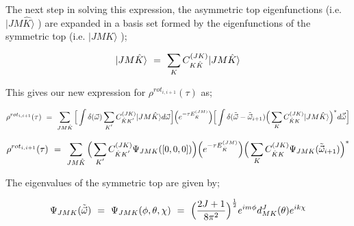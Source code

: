 \documentclass{ece}
\begin{document}
The next step in solving this expression, the asymmetric top eigenfunctions (i.e. \begin{math} | JM\hat{K} \rangle  \end{math} ) are expanded in a basis set formed by the eigenfunctions of the symmetric top (i.e. \begin{math} | JMK \rangle  \end{math} );

\begin{equation}
    | JM\hat{K} \rangle \hspace{0.125cm} = \hspace{0.125cm} \sum_{K} C_{K \hat{K}}^{(JK)} | JM\hat{K} \rangle  
\end{equation}

This gives our new expression for \begin{math}  \rho^{rot_{i, i+1}} ( \tau ) \end{math} as;

\begin{equation}
    \rho^{rot_{i, i+1}} ( \tau ) \hspace{0.125cm} = \hspace{0.125cm} \sum_{J M \hat{K}} \Big[ \int \delta ( \vec{\omega} ) \sum_{K^{'}} C_{\hat{K} K^{'}}^{(JK)} | JM\hat{K}  \rangle d \vec{\omega} \Big] \Big( e^{- \tau E_{\hat{K}}^{(JM)}} \Big) \Big[ \int \delta ( \Tilde{\vec{\omega}} - \Tilde{\vec{\omega}}_{i+1} ) \Big( \sum_{K} C_{\hat{K} K}^{(JK)} | JM\hat{K}  \rangle \Big)^{*} d \vec{\Tilde{\omega}} \Big]
\end{equation}

\begin{equation}
    \rho^{rot_{i, i+1}} ( \tau ) \hspace{0.125cm} = \hspace{0.125cm} \sum_{J M \hat{K}} \Big( \sum_{K^{'}} C_{\hat{K} K^{'}}^{(JK)} \Psi_{JMK} ( [0, 0, 0] ) \Big) \Big( e^{- \tau E_{\hat{K}}^{(JM)}} \Big) \Big( \sum_{K} C_{\hat{K} K}^{(JK)} \Psi_{JMK} ( \Tilde{\vec{\omega}}_{i+1} ) \Big)^{*} 
\end{equation}

The eigenvalues of the symmetric top are given by;

\begin{equation}
   \Psi_{JMK} ( \Tilde{\vec{\omega}} ) \hspace{0.125cm} = \hspace{0.125cm} \Psi_{JMK} ( \phi , \theta, \chi ) \hspace{0.125cm} = \hspace{0.125cm} \Big( \frac{2 J + 1}{8 \pi^2} \Big)^{\frac{1}{2}} e^{i m \phi} d_{MK}^{J} (\theta )  e^{i k \chi}
\end{equation}
\end{document}
